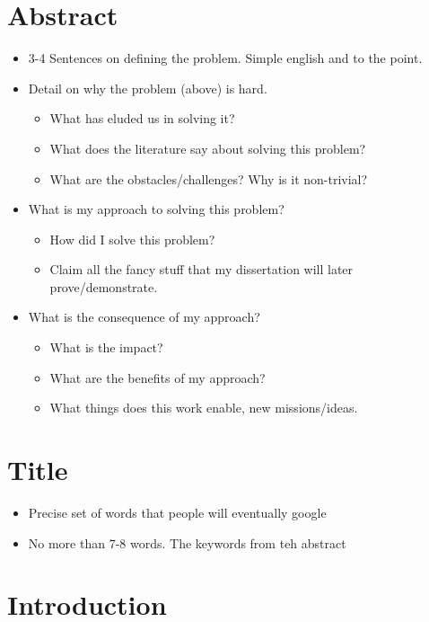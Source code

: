 
\chapter{Abstract}
\begin{itemize}
    \item 3-4 Sentences on defining the problem.
        Simple english and to the point.
    \item Detail on why the problem (above) is hard.
        \begin{itemize}
            \item What has eluded us in solving it?
            \item What does the literature say about solving this problem?
            \item What are the obstacles/challenges? Why is it non-trivial?
        \end{itemize}
    \item What is my approach to solving this problem?
        \begin{itemize}
            \item How did I solve this problem?
            \item Claim all the fancy stuff that my dissertation will later prove/demonstrate.
        \end{itemize}
    \item What is the consequence of my approach?
        \begin{itemize}
            \item What is the impact?
            \item What are the benefits of my approach?
            \item What things does this work enable, new missions/ideas.
        \end{itemize}
\end{itemize}

\chapter{Title}
\begin{itemize}
    \item Precise set of words that people will eventually google
    \item No more than 7-8 words. The keywords from teh abstract
\end{itemize}

\chapter{Introduction}

